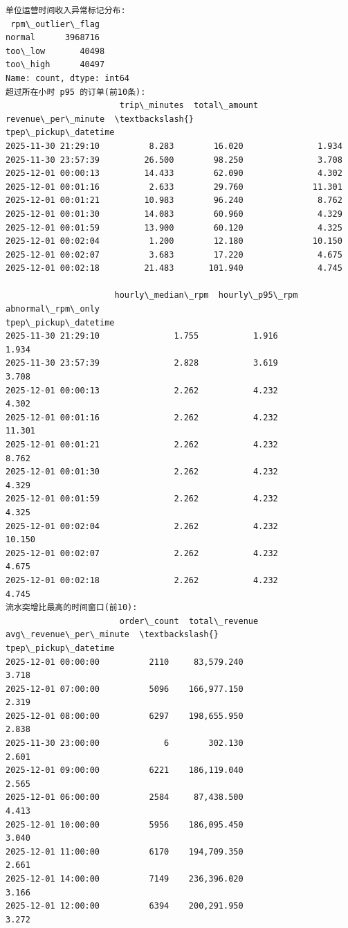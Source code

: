 \documentclass[11pt]{article}
\begin{document}
    \begin{Verbatim}[commandchars=\\\{\}]
单位运营时间收入异常标记分布:
 rpm\_outlier\_flag
normal      3968716
too\_low       40498
too\_high      40497
Name: count, dtype: int64
超过所在小时 p95 的订单(前10条):
                       trip\_minutes  total\_amount  revenue\_per\_minute  \textbackslash{}
tpep\_pickup\_datetime
2025-11-30 21:29:10          8.283        16.020               1.934
2025-11-30 23:57:39         26.500        98.250               3.708
2025-12-01 00:00:13         14.433        62.090               4.302
2025-12-01 00:01:16          2.633        29.760              11.301
2025-12-01 00:01:21         10.983        96.240               8.762
2025-12-01 00:01:30         14.083        60.960               4.329
2025-12-01 00:01:59         13.900        60.120               4.325
2025-12-01 00:02:04          1.200        12.180              10.150
2025-12-01 00:02:07          3.683        17.220               4.675
2025-12-01 00:02:18         21.483       101.940               4.745

                      hourly\_median\_rpm  hourly\_p95\_rpm  abnormal\_rpm\_only
tpep\_pickup\_datetime
2025-11-30 21:29:10               1.755           1.916              1.934
2025-11-30 23:57:39               2.828           3.619              3.708
2025-12-01 00:00:13               2.262           4.232              4.302
2025-12-01 00:01:16               2.262           4.232             11.301
2025-12-01 00:01:21               2.262           4.232              8.762
2025-12-01 00:01:30               2.262           4.232              4.329
2025-12-01 00:01:59               2.262           4.232              4.325
2025-12-01 00:02:04               2.262           4.232             10.150
2025-12-01 00:02:07               2.262           4.232              4.675
2025-12-01 00:02:18               2.262           4.232              4.745
流水突增比最高的时间窗口(前10):
                       order\_count  total\_revenue  avg\_revenue\_per\_minute  \textbackslash{}
tpep\_pickup\_datetime
2025-12-01 00:00:00          2110     83,579.240                   3.718
2025-12-01 07:00:00          5096    166,977.150                   2.319
2025-12-01 08:00:00          6297    198,655.950                   2.838
2025-11-30 23:00:00             6        302.130                   2.601
2025-12-01 09:00:00          6221    186,119.040                   2.565
2025-12-01 06:00:00          2584     87,438.500                   4.413
2025-12-01 10:00:00          5956    186,095.450                   3.040
2025-12-01 11:00:00          6170    194,709.350                   2.661
2025-12-01 14:00:00          7149    236,396.020                   3.166
2025-12-01 12:00:00          6394    200,291.950                   3.272


\end{Verbatim}
\end{document}
